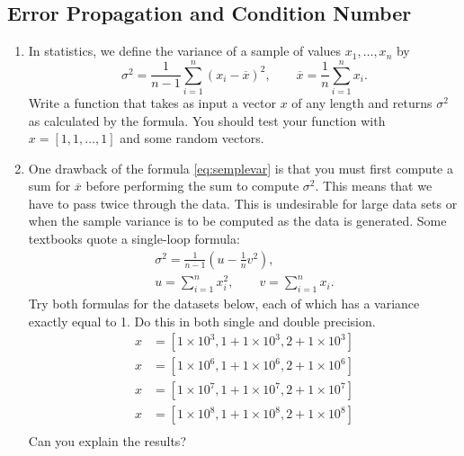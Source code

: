 \subsection{Error Propagation and Condition Number}

\begin{exercise}
    \begin{enumerate}
       \item In statistics, we define the variance of a sample of values $x_1,\ldots,x_n$ by
            \begin{equation}\label{eq:semplevar}
                \sigma^2 = \frac{1}{n-1} \sum_{i=1}^n (x_{i} - \overline{x})^{2},
                \qquad 
                \overline{x} = \frac{1}{n} \sum_{i=1}^n x_i.
            \end{equation}
            Write a function that takes as input a vector $x$ of any length and returns $\sigma^2$ as calculated by the formula. You should test your function with $x=[1,1,\ldots,1]$ and some random vectors.
        \item One drawback of the formula \eqref{eq:semplevar} is that you must first compute a sum for $\overline{x}$ before performing the sum to compute $\sigma^2$. This means that we have to pass twice through the data. This is undesirable for large data sets or when the sample variance is to be computed as the data is generated. Some textbooks quote a single-loop formula:
            \[
            \begin{split}
                \sigma^2 = \frac{1}{n-1} \left( u - \tfrac{1}{n}v^2 \right),\\
                u  = \sum_{i=1}^n x_i^2, 
                \qquad
                v = \sum_{i=1}^n x_i.
            \end{split}
            \]
            Try both formulas for the datasets below, each of which has a variance exactly equal to 1. Do this in both single and double precision.
            \begin{align*}
                x & = [ 1 \times 10^{3}, 1 + 1 \times 10^{3}, 2 + 1 \times 10^{3} ] \\
                x & = [ 1 \times 10^{6}, 1 + 1 \times 10^{6}, 2 + 1 \times 10^{6} ] \\
                x & = [ 1 \times 10^{7}, 1 + 1 \times 10^{7}, 2 + 1 \times 10^{7} ] \\
                x & = [ 1 \times 10^{8}, 1 + 1 \times 10^{8}, 2 + 1 \times 10^{8} ] \\
            \end{align*}
            Can you explain the results?
    \end{enumerate}
\end{exercise}

